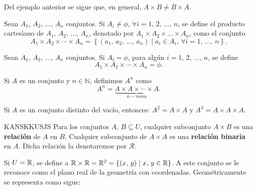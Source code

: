 \begin{obs}{}{}
    Del ejemplo anterior se sigue que, en general, $A \times B \neq B \times A$.
\end{obs}

\begin{definicion}{}{}
    Sean $A_1, \, A_2, \, \dots, \, A_n$ conjuntos. Si $A_i \neq \phi, \, \forall i=1, \, 2, \, \dots, \, n$, se define el producto cartesiano de $A_1, \, A_2, \, \dots, \, A_n$, denotado por $A_1 \times A_2 \times \dots \times A_n$, como el conjunto
    $$A_1 \times A_2 \times \cdots \times A_n=\left\{\left(a_1, \, a_2, \, \dots, \, a_n\right) \mid a_i \in A_i, \, \forall i=1, \, \dots, \, n\right\}.$$
\end{definicion}

\begin{definicion}{}{}
    Sean $A_1, \, A_2, \, \dots, \, A_n$ conjuntos. Si $A_i=\phi$, para algún $i=1, \,2, \, \dots, \, n$, se define
    $$A_1 \times A_2 \times \cdots \times A_n=\phi.$$
\end{definicion}

\begin{definicion}{}{}
    Si $A$ es un conjunto y $n \in \mathbb{N}$, definimos $A^n$ como
    $$A^n=\underbrace{A \times A \times \cdots \times A}_{n-\text{veces}}.$$
\end{definicion}

\begin{myexample}
    Si $A$ es un conjunto distinto del vacío, entonces: $A^2=A \times A$ y $A^3=A \times A \times A$.
\end{myexample}

\begin{definicion}{}{KANSKKUSJS}
    Para los conjuntos $A$, $B \subseteq U$, cualquier subconjunto $A \times B$ es una \textbf{relación} de $A$ en $B$. Cualquier subconjunto de $A \times A$ es una \textbf{relación binaria} en $A$. Dicha relación la denotaremos por $\mathcal{R}$.
\end{definicion}

\newpage

\begin{myexample}
    Si $U = \RR$, se define a $\RR \times \RR = \RR[2] = \{ (x, \, y) \mid x, \, y \in \RR \}$. A este conjunto se le  reconoce como el plano real de la geometría con coordenadas. Geométricamente se representa como sigue:
    \begin{center}
    \end{center}
\end{myexample}

